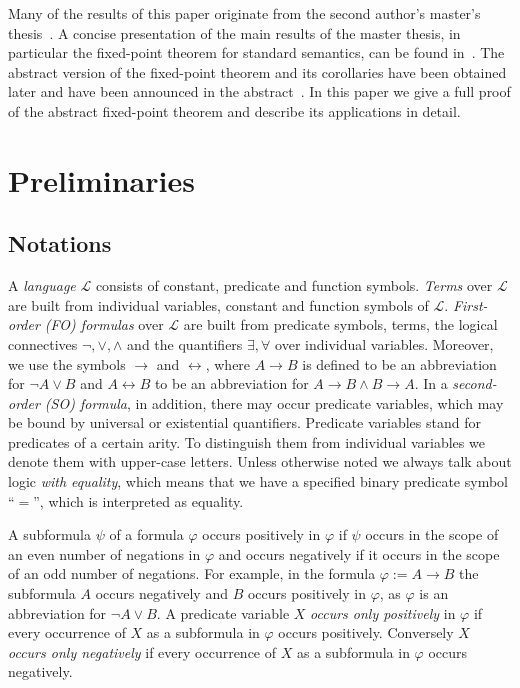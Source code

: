 \documentclass[acmsmall]{acmart}
\theoremstyle{plain}
\theoremstyle{definition}
\begin{document}
Many of the results of this paper originate from the second author's master's thesis~\cite{Kloibhofer20Fixed}.
A concise presentation of the main results of the master thesis, in particular the fixed-point theorem for
 standard semantics, can be found in~\cite{Hetzl21Fixpoint}.
The abstract version of the fixed-point theorem and its corollaries have been obtained later and have been announced in the abstract~\cite{Hetzl21Abstract}.
In this paper we give a full proof of the abstract fixed-point theorem and describe its applications in detail.


\section{Preliminaries}\label{sec.preliminaries}

\subsection{Notations}

A \emph{language} $\mathcal{L}$ consists of constant, predicate and function symbols. \emph{Terms}
 over $\mathcal{L}$ are built from individual variables, constant and function symbols of $\mathcal{L}$.
\emph{First-order (FO) formulas} over $\mathcal{L}$ are built from predicate symbols, terms, the
 logical connectives $\neg, \vee, \wedge$ and the quantifiers $\exists, \forall$ over individual
 variables.
Moreover, we use the symbols $\rightarrow$ and $\leftrightarrow$, where $A \rightarrow B$ is defined
 to be an abbreviation for $\neg A \vee B$ and $A \leftrightarrow B$ to be an abbreviation for
 $A \rightarrow B \wedge B \rightarrow A$.
In a \emph{second-order (SO) formula}, in addition, there may occur predicate variables, which may be
 bound by universal or existential quantifiers.
Predicate variables stand for predicates of a certain arity.
To distinguish them from individual variables we denote them with upper-case letters.
Unless otherwise noted we always talk about logic \emph{with equality}, which means that
 we have a specified binary predicate symbol ``$=$'', which is interpreted as equality.

A subformula $\psi$ of a formula $\varphi$ occurs positively in $\varphi$ if $\psi$ occurs in the scope of an even number of negations in $\varphi$ and occurs negatively if it occurs in the scope of an odd number of negations. For example, in the formula $\varphi := A \rightarrow B$
the subformula $A$ occurs negatively and $B$ occurs positively in $\varphi$, as $\varphi$
is an abbreviation for $\neg A \vee B$. A predicate variable $X$ \emph{occurs only positively} in $\varphi$ if every occurrence of $X$ as a subformula in $\varphi$ occurs positively. Conversely $X$ \emph{occurs only negatively} if every occurrence of $X$ as a subformula in $\varphi$ occurs negatively.
\end{document}
